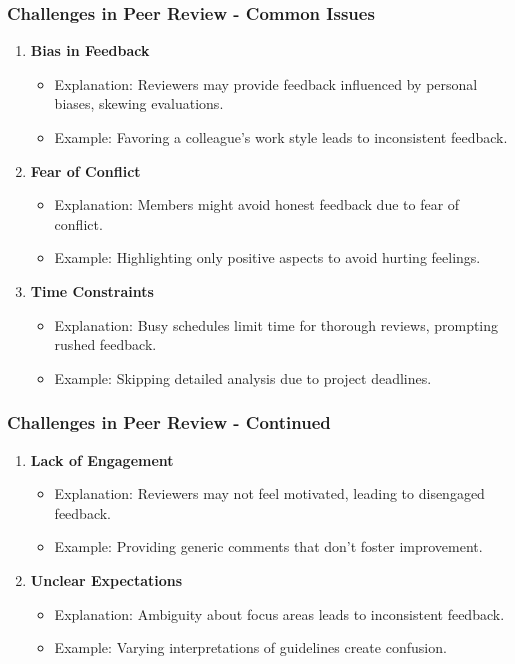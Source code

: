 \documentclass{beamer}
\begin{document}
\begin{frame}[fragile]
    \frametitle{Challenges in Peer Review - Common Issues}
    \begin{enumerate}
        \item \textbf{Bias in Feedback}
        \begin{itemize}
            \item Explanation: Reviewers may provide feedback influenced by personal biases, skewing evaluations.
            \item Example: Favoring a colleague’s work style leads to inconsistent feedback.
        \end{itemize}

        \item \textbf{Fear of Conflict}
        \begin{itemize}
            \item Explanation: Members might avoid honest feedback due to fear of conflict.
            \item Example: Highlighting only positive aspects to avoid hurting feelings.
        \end{itemize}
        
        \item \textbf{Time Constraints}
        \begin{itemize}
            \item Explanation: Busy schedules limit time for thorough reviews, prompting rushed feedback.
            \item Example: Skipping detailed analysis due to project deadlines.
        \end{itemize}
    \end{enumerate}
\end{frame}

\begin{frame}[fragile]
    \frametitle{Challenges in Peer Review - Continued}
    \begin{enumerate}[resume]
        \item \textbf{Lack of Engagement}
        \begin{itemize}
            \item Explanation: Reviewers may not feel motivated, leading to disengaged feedback.
            \item Example: Providing generic comments that don't foster improvement.
        \end{itemize}

        \item \textbf{Unclear Expectations}
        \begin{itemize}
            \item Explanation: Ambiguity about focus areas leads to inconsistent feedback.
            \item Example: Varying interpretations of guidelines create confusion.
        \end{itemize}
    \end{enumerate}
\end{frame}
\end{document}
